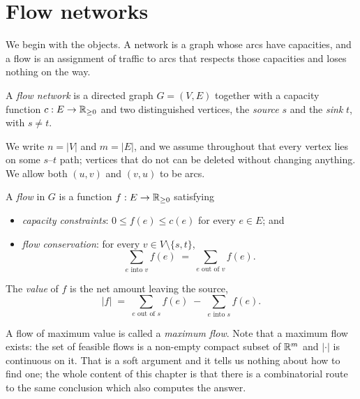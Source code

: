 \section{Flow networks}
\label{sec:flow-networks}

We begin with the objects. A network is a graph whose arcs have capacities,
and a flow is an assignment of traffic to arcs that respects those capacities
and loses nothing on the way.

\begin{definition}
A \emph{flow network} is a directed graph $G = (V,E)$ together with a capacity
function $c : E \to \mathbb{R}_{\ge 0}$ and two distinguished vertices, the
\emph{source} $s$ and the \emph{sink} $t$, with $s \ne t$.
\end{definition}

We write $n = |V|$ and $m = |E|$, and we assume throughout that every vertex
lies on some $s$--$t$ path; vertices that do not can be deleted without
changing anything. We allow both $(u,v)$ and $(v,u)$ to be arcs.

\begin{definition}[Flow]
A \emph{flow} in $G$ is a function $f : E \to \mathbb{R}_{\ge 0}$ satisfying
\begin{itemize}[nosep]
  \item \emph{capacity constraints}: $0 \le f(e) \le c(e)$ for every
        $e \in E$; and
  \item \emph{flow conservation}: for every $v \in V \setminus \{s,t\}$,
        \[ \sum_{e \text{ into } v} f(e) \;=\; \sum_{e \text{ out of } v} f(e). \]
\end{itemize}
The \emph{value} of $f$ is the net amount leaving the source,
\[ |f| \;=\; \sum_{e \text{ out of } s} f(e) \;-\; \sum_{e \text{ into } s} f(e). \]
\end{definition}

A flow of maximum value is called a \emph{maximum flow}. Note that a maximum
flow exists: the set of feasible flows is a non-empty compact subset of
$\mathbb{R}^m$ and $|\cdot|$ is continuous on it. That is a soft argument and it tells
us nothing about how to find one; the whole content of this chapter is that
there is a combinatorial route to the same conclusion which also computes the
answer.

